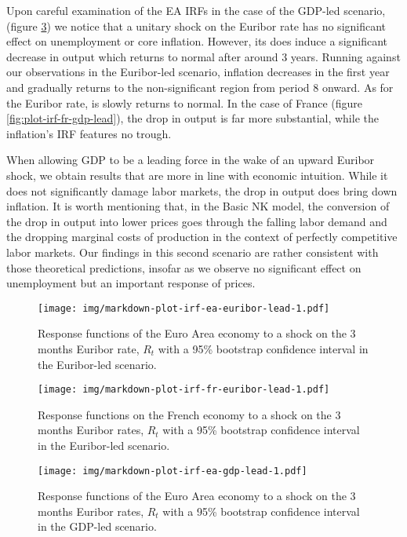 \documentclass[
  11pt,
]{article}
\begin{document}
Upon careful examination of the EA IRFs in the case of the GDP-led scenario, (figure \ref{fig:plot-irf-ea-gdp-lead}) we notice that a unitary shock on the Euribor rate has no significant effect on unemployment or core inflation. However, its does induce a significant decrease in output which returns to normal after around 3 years. Running against our observations in the Euribor-led scenario, inflation decreases in the first year and gradually returns to the non-significant region from period 8 onward. As for the Euribor rate, is slowly returns to normal. In the case of France (figure \ref{fig:plot-irf-fr-gdp-lead}), the drop in output is far more substantial, while the inflation's IRF features no trough.

When allowing GDP to be a leading force in the wake of an upward Euribor shock, we obtain results that are more in line with economic intuition. While it does not significantly damage labor markets, the drop in output does bring down inflation. It is worth mentioning that, in the Basic NK model, the conversion of the drop in output into lower prices goes through the falling labor demand and the dropping marginal costs of production in the context of perfectly competitive labor markets. Our findings in this second scenario are rather consistent with those theoretical predictions, insofar as we observe no significant effect on unemployment but an important response of prices.

\begin{figure}
\centering
\texttt{[image: img/markdown-plot-irf-ea-euribor-lead-1.pdf]}
\caption{\label{fig:plot-irf-ea-euribor-lead}Response functions of the Euro Area economy to a shock on the 3 months Euribor rate, \(R_t\) with a 95\% bootstrap confidence interval in the Euribor-led scenario.}
\end{figure}

\begin{figure}
\centering
\texttt{[image: img/markdown-plot-irf-fr-euribor-lead-1.pdf]}
\caption{\label{fig:plot-irf-fr-euribor-lead}Response functions on the French economy to a shock on the 3 months Euribor rates, \(R_t\) with a 95\% bootstrap confidence interval in the Euribor-led scenario.}
\end{figure}

\begin{figure}
\centering
\texttt{[image: img/markdown-plot-irf-ea-gdp-lead-1.pdf]}
\caption{\label{fig:plot-irf-ea-gdp-lead}Response functions of the Euro Area economy to a shock on the 3 months Euribor rates, \(R_t\) with a 95\% bootstrap confidence interval in the GDP-led scenario.}
\end{figure}
\end{document}

